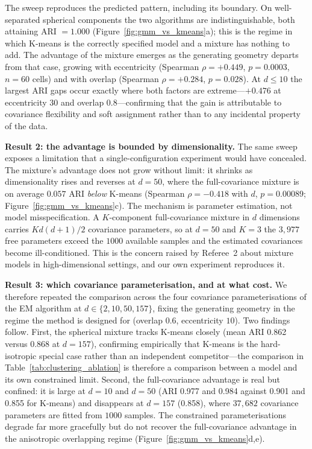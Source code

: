 \documentclass[lettersize,journal]{IEEEtran}
\begin{document}
{{		\noindent The sweep reproduces the predicted pattern, including its boundary. On well-separated spherical components the two algorithms are indistinguishable, both attaining ARI $= 1.000$ (Figure~\ref{fig:gmm_vs_kmeans}a); this is the regime in which K-means is the correctly specified model and a mixture has nothing to add. The advantage of the mixture emerges as the generating geometry departs from that case, growing with eccentricity (Spearman $\rho = +0.449$, $p = 0.0003$, $n = 60$ cells) and with overlap (Spearman $\rho = +0.284$, $p = 0.028$). At $d \leq 10$ the largest ARI gaps occur exactly where both factors are extreme---$+0.476$ at eccentricity $30$ and overlap $0.8$---confirming that the gain is attributable to covariance flexibility and soft assignment rather than to any incidental property of the data.
		
		\noindent \textbf{Result 2: the advantage is bounded by dimensionality.} The same sweep exposes a limitation that a single-configuration experiment would have concealed. The mixture's advantage does not grow without limit: it shrinks as dimensionality rises and reverses at $d = 50$, where the full-covariance mixture is on average $0.057$ ARI \emph{below} K-means (Spearman $\rho = -0.418$ with $d$, $p = 0.00089$; Figure~\ref{fig:gmm_vs_kmeans}c). The mechanism is parameter estimation, not model misspecification. A $K$-component full-covariance mixture in $d$ dimensions carries $Kd(d+1)/2$ covariance parameters, so at $d = 50$ and $K = 3$ the $3{,}977$ free parameters exceed the $1000$ available samples and the estimated covariances become ill-conditioned. This is the concern raised by Referee~2 about mixture models in high-dimensional settings, and our own experiment reproduces it.
		
		\noindent \textbf{Result 3: which covariance parameterisation, and at what cost.} We therefore repeated the comparison across the four covariance parameterisations of the EM algorithm at $d \in \{2, 10, 50, 157\}$, fixing the generating geometry in the regime the method is designed for (overlap $0.6$, eccentricity $10$). Two findings follow. First, the spherical mixture tracks K-means closely (mean ARI 0.862 versus 0.868 at $d=157$), confirming empirically that K-means is the hard-isotropic special case rather than an independent competitor---the comparison in Table~\ref{tab:clustering_ablation} is therefore a comparison between a model and its own constrained limit. Second, the full-covariance advantage is real but confined: it is large at $d = 10$ and $d = 50$ (ARI 0.977 and 0.984 against 0.901 and 0.855 for K-means) and disappears at $d = 157$ (0.858), where $37{,}682$ covariance parameters are fitted from $1000$ samples. The constrained parameterisations degrade far more gracefully but do not recover the full-covariance advantage in the anisotropic overlapping regime (Figure~\ref{fig:gmm_vs_kmeans}d,e).
		
}}
\end{document}
